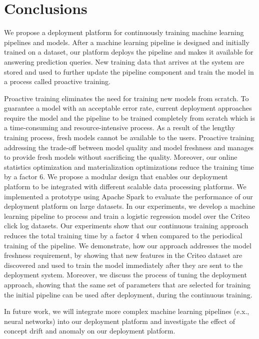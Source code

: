 \section{Conclusions} \label{conclusion}
We propose a deployment platform for continuously training machine learning pipelines and models.
After a machine learning pipeline is designed and initially trained on a dataset, our platform deploys the pipeline and makes it available for answering prediction queries.
New training data that arrives at the system are stored and used to further update the pipeline component and train the model in a process called proactive training.

Proactive training eliminates the need for training new models from scratch.
To guarantee a model with an acceptable error rate, current deployment approaches require the model and the pipeline to be trained completely from scratch which is a time-consuming and resource-intensive process.
As a result of the lengthy training process, fresh models cannot be available to the users.
Proactive training addressing the trade-off between model quality and model freshness and manages to provide fresh models without sacrificing the quality. 
Moreover, our online statistics optimization and materialization optimizations reduce the training time by a factor 6.
We propose a modular design that enables our deployment platform to be integrated with different scalable data processing platforms.
We implemented a prototype using Apache Spark to evaluate the performance of our deployment platform on large datasets.
In our experiments, we develop a machine learning pipeline to process and train a logistic regression model over the Criteo click log datasets.
Our experiments show that our continuous training approach reduces the total training time by a factor 4 when compared to the periodical training of the pipeline.
We demonstrate, how our approach addresses the model freshness requirement, by showing that new features in the Criteo dataset are discovered and used to train the model immediately after they are sent to the deployment system.
Moreover, we discuss the process of tuning the deployment approach, showing that the same set of parameters that are selected for training the initial pipeline can be used after deployment, during the continuous training.

In future work, we will integrate more complex machine learning pipelines (e.x., neural networks) into our deployment platform and investigate the effect of concept drift and anomaly on our deployment platform.

